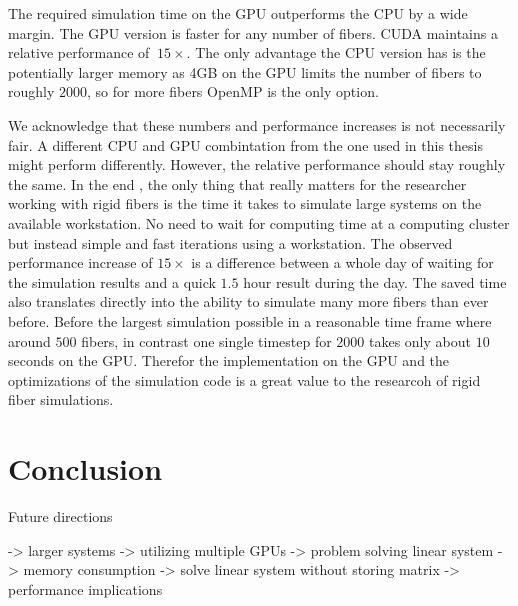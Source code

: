 \documentclass[a4paper,11pt]{kth-mag}
\begin{document}
The required simulation time on the GPU outperforms the CPU by a wide margin. The GPU version is faster for any number of fibers. CUDA maintains a relative performance of $~15×$. The only advantage the CPU version has is the potentially larger memory as 4GB on the GPU limits the number of fibers to roughly $2000$, so for more fibers OpenMP is the only option.

We acknowledge that these numbers and performance increases is not necessarily fair. A different CPU and GPU combintation from the one used in this thesis might perform differently. However, the relative performance should stay roughly the same. In the end , the only thing that really matters for the researcher working with rigid fibers is the time it takes to simulate large systems on the available workstation. No need to wait for computing time at a computing cluster but instead simple and fast iterations using a workstation. The observed performance increase of $15×$ is a difference between a whole day of waiting for the simulation results and a quick $1.5$ hour result during the day. The saved time also translates directly into the ability to simulate many more fibers than ever before. Before the largest simulation possible in a reasonable time frame where around $500$ fibers, in contrast one single timestep for $2000$ takes only about $10$ seconds on the GPU. Therefor the implementation on the GPU and the optimizations of the simulation code is a great value to the researcoh of rigid fiber simulations.

\chapter{Conclusion}

Future directions

-> larger systems -> utilizing multiple GPUs -> problem solving linear system
-> memory consumption -> solve linear system without storing matrix -> performance implications

\appendix
\addappheadtotoc
\end{document}
